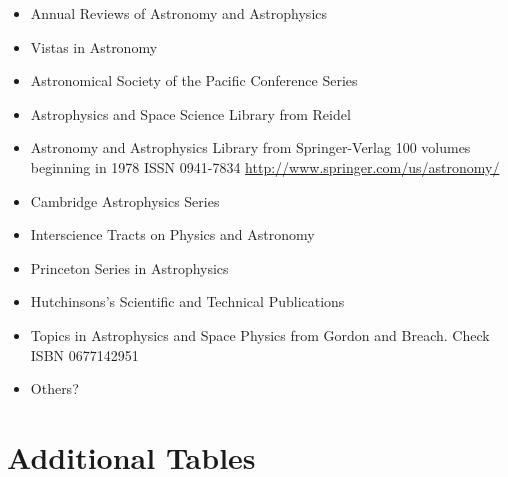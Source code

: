 \documentclass{article}
\begin{document}
\begin{itemize}
\item Annual Reviews of Astronomy and Astrophysics
\item Vistas in Astronomy
\item Astronomical Society of the Pacific Conference Series
\item Astrophysics and Space Science Library from Reidel
\item Astronomy and Astrophysics Library from Springer-Verlag
  100 volumes beginning in 1978 ISSN 0941-7834
  \url{http://www.springer.com/us/astronomy/}
\item Cambridge Astrophysics Series
\item Interscience Tracts on Physics and Astronomy
\item Princeton Series in Astrophysics
\item Hutchinsons's Scientific and Technical Publications
\item Topics in Astrophysics and Space Physics from Gordon and Breach. Check ISBN 0677142951
  
\item Others?
\end{itemize}

\section{Additional Tables}


\end{document}
